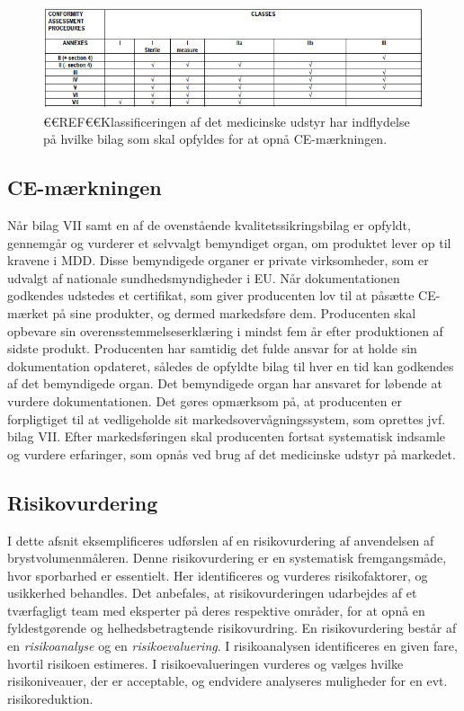 \begin{figure}[htb]
\centering
\includegraphics[width=5in]{Klassificering}
\caption{€€REF€€Klassificeringen af det medicinske udstyr har indflydelse på hvilke bilag som skal opfyldes for at opnå CE-mærkningen.}
\label{fig:Klas}
\end{figure}

\subsection{CE-mærkningen}
   
Når bilag VII samt en af de ovenstående kvalitetssikringsbilag er opfyldt, gennemgår og vurderer et selvvalgt bemyndiget organ, om produktet lever op til kravene i MDD. Disse bemyndigede organer er private virksomheder, som er udvalgt af nationale sundhedsmyndigheder i EU. Når dokumentationen godkendes udstedes et certifikat, som giver producenten lov til at påsætte CE-mærket på sine produkter, og dermed markedsføre dem.    
 Producenten skal opbevare sin overensstemmelseserklæring i mindst fem år efter produktionen af sidste produkt. Producenten har samtidig det fulde ansvar for at holde sin dokumentation opdateret, således de opfyldte bilag til hver en tid kan godkendes af det bemyndigede organ. Det bemyndigede organ har ansvaret for løbende at vurdere dokumentationen.
Det gøres opmærksom på, at producenten er forpligtiget til at vedligeholde sit markedsovervågningssystem, som oprettes jvf. bilag VII. Efter markedsføringen skal producenten fortsat systematisk indsamle og vurdere erfaringer, som opnås ved brug af det medicinske udstyr på markedet. 

\subsection{Risikovurdering}
I dette afsnit eksemplificeres udførslen af en risikovurdering af anvendelsen af brystvolumenmåleren. Denne risikovurdering er en systematisk fremgangsmåde, hvor sporbarhed er essentielt. Her identificeres og vurderes risikofaktorer, og usikkerhed behandles. 
Det anbefales, at risikovurderingen udarbejdes af et tværfagligt team med eksperter på deres respektive områder, for at opnå en fyldestgørende og helhedsbetragtende risikovurdring.   
En risikovurdering består af en \textit{risikoanalyse} og en \textit{risikoevaluering}. I risikoanalysen identificeres en given fare, hvortil risikoen estimeres. I risikoevalueringen vurderes og vælges hvilke risikoniveauer, der er acceptable, og endvidere analyseres muligheder for en evt. risikoreduktion.

